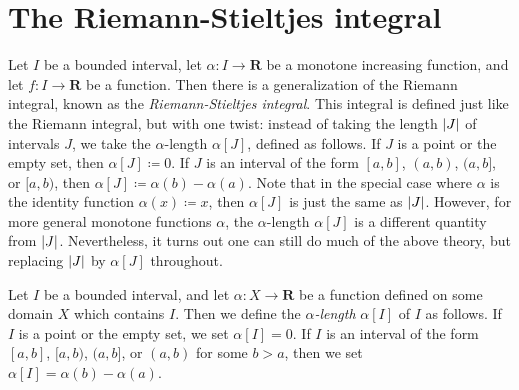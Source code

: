 \section{The Riemann-Stieltjes integral}\label{sec 11.8}

\begin{note}
    Let \(I\) be a bounded interval, let \(\alpha : I \to \mathbf{R}\) be a monotone increasing function, and let \(f : I \to \mathbf{R}\) be a function.
    Then there is a generalization of the Riemann integral, known as the \emph{Riemann-Stieltjes integral}.
    This integral is defined just like the Riemann integral, but with one twist:
    instead of taking the length \(\abs*{J}\) of intervals \(J\), we take the \(\alpha\)-length \(\alpha[J]\), defined as follows.
    If \(J\) is a point or the empty set, then \(\alpha[J] \coloneqq 0\).
    If \(J\) is an interval of the form \([a, b]\), \((a, b)\), \((a, b]\), or \([a, b)\), then \(\alpha[J] \coloneqq \alpha(b) - \alpha(a)\).
    Note that in the special case where \(\alpha\) is the identity function \(\alpha(x) \coloneqq x\), then \(\alpha[J]\) is just the same as \(\abs*{J}\).
    However, for more general monotone functions \(\alpha\), the \(\alpha\)-length \(\alpha[J]\) is a different quantity from \(\abs*{J}\).
    Nevertheless, it turns out one can still do much of the above theory, but replacing \(\abs*{J}\) by \(\alpha[J]\) throughout.
\end{note}

\begin{definition}\label{11.8.1}
    Let \(I\) be a bounded interval, and let \(\alpha : X \to \mathbf{R}\) be a function defined on some domain \(X\) which contains \(I\).
    Then we define the \emph{\(\alpha\)-length} \(\alpha[I]\) of \(I\) as follows.
    If \(I\) is a point or the empty set, we set \(\alpha[I] = 0\).
    If \(I\) is an interval of the form \([a, b]\), \([a, b)\), \((a, b]\), or \((a, b)\) for some \(b > a\), then we set \(\alpha[I] = \alpha(b) - \alpha(a)\).
\end{definition}